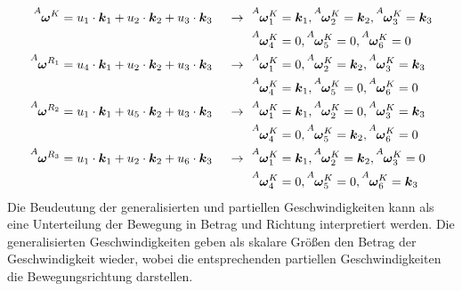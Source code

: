 \begin{align}
\vel{A}{\omega}{K} &= u\idx1 \cdot \bs{k}\idx1 + u\idx2 \cdot \bs{k}\idx2 + u\idx3 \cdot \bs{k}\idx3 &\rArrow &\vel{A}{\omega}{K}\idx1 = \bs{k}\idx1, \vel{A}{\omega}{K}\idx2 = \bs{k}\idx2, \vel{A}{\omega}{K}\idx3 = \bs{k}\idx3 \\
& & &\vel{A}{\omega}{K}\idx4 = 0, \vel{A}{\omega}{K}\idx5 = 0, \vel{A}{\omega}{K}\idx6 = 0 \nonumber
\\
\vel{A}{\omega}{R\idx1} &= u\idx4 \cdot \bs{k}\idx1 + u\idx2 \cdot \bs{k}\idx2 + u\idx3 \cdot \bs{k}\idx3 &\rArrow 
&\vel{A}{\omega}{K}\idx1 = 0, \vel{A}{\omega}{K}\idx2 = \bs{k}\idx2, \vel{A}{\omega}{K}\idx3 = \bs{k}\idx3 \\
& & &\vel{A}{\omega}{K}\idx4 = \bs{k}\idx1, \vel{A}{\omega}{K}\idx5 = 0, \vel{A}{\omega}{K}\idx6 = 0 \nonumber
\\
\vel{A}{\omega}{R\idx2} &= u\idx1 \cdot \bs{k}\idx1 + u\idx5 \cdot \bs{k}\idx2 + u\idx3 \cdot \bs{k}\idx3&\rArrow 
&\vel{A}{\omega}{K}\idx1 = \bs{k}\idx1, \vel{A}{\omega}{K}\idx2 = 0, \vel{A}{\omega}{K}\idx3 = \bs{k}\idx3 \\
& & &\vel{A}{\omega}{K}\idx4 = 0, \vel{A}{\omega}{K}\idx5 = \bs{k}\idx2, \vel{A}{\omega}{K}\idx6 = 0 \nonumber
\\
\vel{A}{\omega}{R\idx3} &= u\idx1 \cdot \bs{k}\idx1 + u\idx2 \cdot \bs{k}\idx2 + u\idx6 \cdot \bs{k}\idx3&\rArrow 
&\vel{A}{\omega}{K}\idx1 = \bs{k}\idx1, \vel{A}{\omega}{K}\idx2 = \bs{k}\idx2, \vel{A}{\omega}{K}\idx3 = 0 \\
& & &\vel{A}{\omega}{K}\idx4 = 0, \vel{A}{\omega}{K}\idx5 = 0, \vel{A}{\omega}{K}\idx6 = \bs{k}\idx3 \nonumber \,
\end{align}
Die Beudeutung der generalisierten und partiellen Geschwindigkeiten kann als eine Unterteilung der Bewegung in Betrag und Richtung interpretiert werden. Die generalisierten Geschwindigkeiten geben als skalare Größen den Betrag der Geschwindigkeit wieder, wobei die entsprechenden partiellen Geschwindigkeiten die Bewegungsrichtung darstellen.
